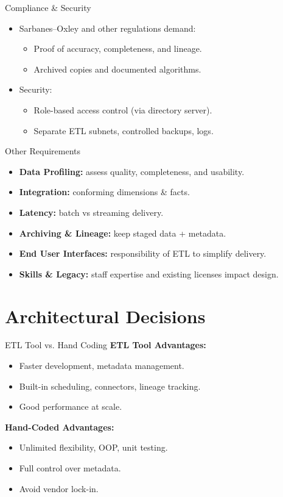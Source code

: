 \documentclass[aspectratio=169]{beamer}
\begin{document}
\begin{frame}{Compliance \& Security}
    \begin{itemize}
        \item Sarbanes–Oxley and other regulations demand:
        \begin{itemize}
            \item Proof of accuracy, completeness, and lineage.
            \item Archived copies and documented algorithms.
        \end{itemize}
        \item Security:
        \begin{itemize}
            \item Role-based access control (via directory server).
            \item Separate ETL subnets, controlled backups, logs.
        \end{itemize}
    \end{itemize}
\end{frame}

\begin{frame}{Other Requirements}
    \begin{itemize}
        \item \textbf{Data Profiling:} assess quality, completeness, and usability.
        \item \textbf{Integration:} conforming dimensions \& facts.
        \item \textbf{Latency:} batch vs streaming delivery.
        \item \textbf{Archiving \& Lineage:} keep staged data + metadata.
        \item \textbf{End User Interfaces:} responsibility of ETL to simplify delivery.
        \item \textbf{Skills \& Legacy:} staff expertise and existing licenses impact design.
    \end{itemize}
\end{frame}

\section{Architectural Decisions}

\begin{frame}{ETL Tool vs. Hand Coding}
    \textbf{ETL Tool Advantages:}
    \begin{itemize}
        \item Faster development, metadata management.
        \item Built-in scheduling, connectors, lineage tracking.
        \item Good performance at scale.
    \end{itemize}
    \textbf{Hand-Coded Advantages:}
    \begin{itemize}
        \item Unlimited flexibility, OOP, unit testing.
        \item Full control over metadata.
        \item Avoid vendor lock-in.
    \end{itemize}
\end{frame}
\end{document}
